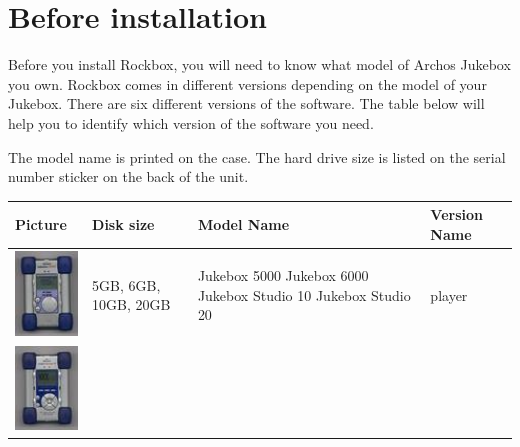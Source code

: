 \section{Before installation}

Before you install Rockbox, you will need to know what model of Archos Jukebox
you own.  Rockbox comes in different versions depending on the model of your
Jukebox.  There are six different versions of the software.  The table below
will help you to identify which version of the software you need.

The model name is printed on the case.  The hard drive size is listed on the
serial number sticker on the back of the unit.

\begin{center}
  \begin{tabularx}{\textwidth}{llXl}\toprule
    \label{ref:Jukeboxtypetable}
    \textbf{Picture} & \textbf{Disk size} & \textbf{Model Name} & \textbf{Version Name} \\\midrule
    \begin{minipage}{2.2cm}
      \includegraphics[width=2cm]{getting_started/images/archos-studio-small.png}
    \end{minipage} 
    & 5GB, 6GB, 10GB, 20GB & 
                             \begin{minipage}{8cm}
                             Jukebox 5000 \newline
                             Jukebox 6000 \newline
                             Jukebox Studio 10 \newline
                             Jukebox Studio 20
                             \end{minipage}
                               & player \\\midrule
    \begin{minipage}{2.2cm}
      \includegraphics[width=2cm]{getting_started/images/archos-recorder-small.png}

\end{minipage}
\end{tabularx}
\end{center}
